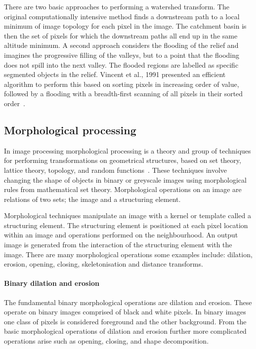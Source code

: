 There are two basic approaches to performing a watershed transform. The original computationally intensive method finds a downstream path to a local minimum of image topology for each pixel in the image. The catchment basin is then the set of pixels for which the downstream paths all end up in the same altitude minimum. A second approach considers the flooding of the relief and imagines the progressive filling of the valleys, but to a point that the flooding does not spill into the next valley. The flooded regions are labelled as specific segmented objects in the relief. Vincent et al., 1991  presented an efficient algorithm to perform this based on sorting pixels in increasing order of value, followed by a flooding with a breadth-first scanning of all pixels in their sorted order~\cite{Vincent1991}.

\subsection{Morphological processing}
\label{introduction:image_processing:morphological_processing}
In image processing morphological processing is a theory and group of techniques for performing transformations on geometrical structures, based on set theory, lattice theory, topology, and random functions~\cite{Goutsias2000}. These techniques involve changing the shape of objects in binary or greyscale images using morphological rules from mathematical set theory. Morphological operations on an image are relations of two sets; the image and a structuring element.

Morphological techniques manipulate an image with a kernel or template called a structuring element. The structuring element is positioned at each pixel location within an image and operations performed on the neighbourhood. An output image is generated from the interaction of the structuring element with the image. There are many morphological operations some examples include: dilation, erosion, opening, closing, skeletonisation and distance transforms.

\paragraph{Binary dilation and erosion}
The fundamental binary morphological operations are dilation and erosion. These operate on binary images comprised of black and white pixels. In binary images one class of pixels is considered foreground and the other background. From the basic morphological operations of dilation and erosion further more complicated operations arise such as opening, closing, and shape decomposition.

